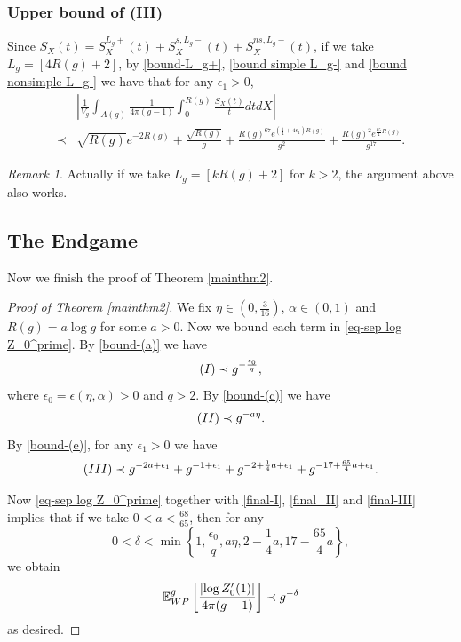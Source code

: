 \documentclass[11pt]{amsart}
\newcommand{\E}{\mathbb{E}_{\rm WP}^g}
\theoremstyle{plain}
\newcommand{\be}{\begin{equation}}
\newcommand{\ene}{\end{equation}}
\theoremstyle{definition}
\theoremstyle{remark}
\newtheorem*{rem*}{Remark}
\begin{document}
\subsubsection{Upper bound of \rm{(III)}} Since $S_X(t)=S_X^{L_g+}(t)+S_X^{s,L_g-}(t)+S_X^{ns,L_g-}(t)$,
 if we take $L_g=[4R(g)+2]$,  by \eqref{bound-L_g+}, \eqref{bound simple L_g-}  and \eqref{bound nonsimple L_g-} we have that for any $\epsilon_1>0$, \begin{equation}\label{bound-(e)}
     \begin{aligned}
 &\left|\frac{1}{V_g}\int_{A(g)} \frac{1}{4\pi(g-1)} \int_0^{R(g)}\frac{S_X(t)}{t}dt dX\right|\\
 \prec &\sqrt{R(g)}e^{-2R(g)}+\frac{\sqrt{R(g)}}{g}+\frac{R(g)^{67}e^{\left(\frac{1}{4}+4\epsilon_1\right)R(g)}}{g^2}+\frac{R(g)^2e^{\frac{65}{4}R(g)}}{g^{17}}.
  \end{aligned}
\end{equation}
\begin{rem*}
    Actually if we take $L_g=[kR(g)+2]$ for $k>2$, the argument above also works.
\end{rem*}



 

\subsection{The Endgame}  Now we finish the proof of Theorem \ref{mainthm2}.\begin{proof}[Proof of Theorem \ref{mainthm2}]
We fix $\eta\in(0,\frac{3}{16})$, $\alpha\in(0,1)$ and $R(g)=a\log g$ for some $a>0$. Now we bound each term in \eqref{eq-sep log Z_0^prime}. 
By
\eqref{bound-(a)} we have \be\label{final-I}
({\rm{I}})\prec g^{-\frac{\epsilon_0}{q}},\ene
where $\epsilon_0=\epsilon(\eta,\alpha)>0$ and $q>2$. By \eqref{bound-(c)} we have \be\label{final_II}
({\rm{II}})\prec g^{-a \eta }.\ene 
By \eqref{bound-(e)}, for any $\epsilon_1>0$ we have
\be\label{final-III}
({\rm{III}})\prec g^{-2a+\epsilon_1}+g^{-1+\epsilon_1}+g^{-2+\frac{1}{4}a+\epsilon_1}+g^{-17+\frac{65}{4}a+\epsilon_1}.
\ene

\noindent Now \eqref{eq-sep log Z_0^prime} together with \eqref{final-I}, \eqref{final_II} and \eqref{final-III} implies that if we take $0<a<\frac{68}{65}$, then for any $$0<\delta<\min\left\{1,\frac{\epsilon_0}{q},a\eta,2-\frac{1}{4}a,17-\frac{65}{4}a\right\},$$ we obtain $$
\E\left[\frac{\left| \log Z_0^\prime(1) \right|}{4\pi(g-1)}\right]\prec g^{-\delta}
$$
as desired.
\end{proof}





\end{document}
